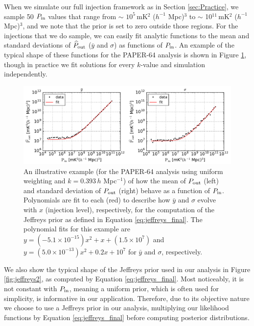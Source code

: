 \documentclass[preprint2,numberedappendix,tighten]{aastex6}  %
\begin{document}
When we simulate our full injection framework as in Section \ref{sec:Practice}, we sample 50 $P_{\rm in}$ values that range from $\sim$ $10^{5}$\,mK$^{2}$ ($h^{-1}$ Mpc)$^{3}$ to $\sim$ 10$^{11}$\,mK$^{2}$ ($h^{-1}$ Mpc)$^{3}$, and we note that the prior is set to zero outside those regions. For the injections that we do sample, we can easily fit analytic functions to the mean and standard deviations of $\widehat{P}_{\rm out}$ ($\bar y$ and $\sigma$) as functions of $P_{\rm in}$. An example of the typical shape of these functions for the PAPER-64 analysis is shown in Figure \ref{fig:jeffreys1}, though in practice we fit solutions for every $k$-value and simulation independently.

\begin{figure}
	\centering
	\includegraphics[width=\columnwidth]{plots/jeffrey_fits.pdf}
	\caption{An illustrative example (for the PAPER-64 analysis using uniform weighting and $k=0.393$\,$h$ Mpc$^{-1}$) of how the mean of $P_{\rm out}$ (left) and standard deviation of $P_{\rm out}$ (right) behave as a function of $P_{\rm in}$. Polynomials are fit to each (red) to describe how $\bar y$ and $\sigma$ evolve with $x$ (injection level), respectively, for the computation of the Jeffreys prior as defined in Equation \eqref{eq:jeffreys_final}. The polynomial fits for this example are $y = (-5.1 \times 10^{-15})x^{2} + x + (1.5 \times 10^{7})$ and $y = (5.0 \times 10^{-13})x^{2} + 0.2 x + 10^{7}$ for $\bar y$ and $\sigma$, respectively.}
	\label{fig:jeffreys1}
\end{figure}

We also show the typical shape of the Jeffreys prior used in our analysis in Figure \ref{fig:jeffreys2}, as computed by Equation \eqref{eq:jeffreys_final}. Most noticeably, it is not constant with $P_{\rm in}$, meaning a uniform prior, which is often used for simplicity, is informative in our application. Therefore, due to its objective nature we choose to use a Jeffreys prior in our analysis, multiplying our likelihood functions by Equation \eqref{eq:jeffreys_final} before computing posterior distributions.
\end{document}
